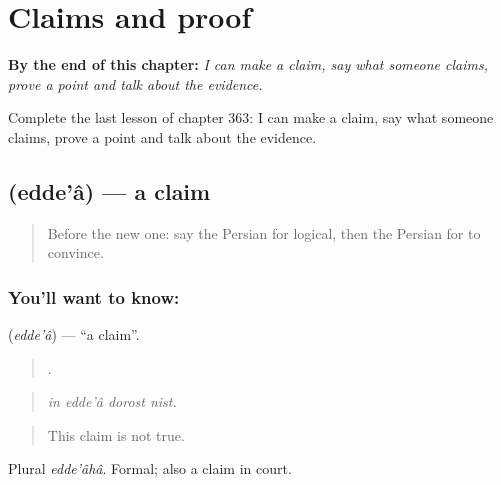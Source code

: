 
\chapter{Claims and proof}
\label{ch:fa-claims-and-proof}

\begin{chapteropening}
\textbf{By the end of this chapter:} \emph{I can make a claim, say what someone claims, prove a point and talk about the evidence.}

Complete the last lesson of chapter 363: I can make a claim, say what someone claims, prove a point and talk about the evidence.
\end{chapteropening}

\section[\texorpdfstring{\fa{ادعا} (edde'â)}{ادعا (edde'â)}]{ (edde'â) — a claim}

\label{lesson:FA-C363-eddea}



\begin{quote}
Before the new one: say the Persian for logical, then the Persian for to convince.
\end{quote}

\subsection*{You'll want to know: }
\textbf{} (\emph{edde'â}) — \textquotedblleft{}a claim\textquotedblright{}.

\begin{quote}
   .
\end{quote}

\begin{quote}
\emph{in edde'â dorost nist.}
\end{quote}

\begin{quote}
This claim is not true.
\end{quote}

Plural \emph{edde'âhâ}. Formal; also a claim in court.

